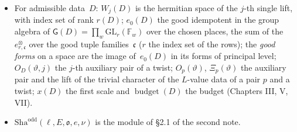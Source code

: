 \documentclass[11pt,a4paper]{article}
\newcommand{\F}{\mathbb{F}}
\newcommand{\m}[1]{\mbox{$#1$}}        %
\theoremstyle{plainx}
\theoremstyle{uprightx}
\newcommand{\fo}{\mathfrak{o}}
\newcommand{\GL}{\mathrm{GL}}
\newcommand{\Dr}[1]{r(#1)}
\newcommand{\Sha}{\mathrm{Sha}}
\newcommand{\tupleIdem}[2]{e^{\otimes}_{#1,#2}}   %
\begin{document}
\begin{itemize}[leftmargin=1.6em,itemsep=1pt]
\item For admissible data~$D$: \m{W_j(D)} is the hermitian space of the $j$-th single lift, with index set of
rank \m{\Dr{D}}; \m{e_0(D)} the good idempotent in the group algebra of \m{\mathsf{G}(D)=\prod_w\GL_r(\F_w)} over the
chosen places, the sum of the \m{\tupleIdem{r}{\mathfrak{c}}} over the good tuple families~$\mathfrak{c}$ ($r$ the index set of the rows); the \emph{good forms} on a space are the image
of~\m{e_0(D)} in its forms of principal level; \m{O_D(\vartheta,j)} the $j$-th auxiliary pair of a twist;
\m{O_p(\vartheta)}, \m{\Xi_p(\vartheta)} the auxiliary pair and the lift of the trivial character of the $L$-value data
of a pair $p$ and a twist; \m{x(D)} the first scale and \m{\operatorname{budget}(D)} the budget (Chapters III, V, VII).
\item \m{\Sha^{\mathrm{odd}}(\ell,E,\fo,e,\nu)} is the module of §2.1 of the second note.
\end{itemize}
\end{document}
